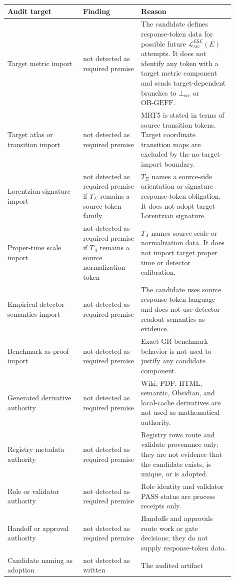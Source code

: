 \documentclass[11pt]{article}
\newcommand{\MetricData}{\mathcal{L}_{\mathrm{src}}^{\mathsf{GSC}}}
\newcommand{\BottomSrc}{\bot_{\mathrm{src}}}
\newcommand{\OBGEFF}{\mathrm{OB\mbox{-}GEFF}}
\begin{document}
\begin{longtable}{p{0.30\linewidth}p{0.23\linewidth}p{0.37\linewidth}}
\toprule
Audit target & Finding & Reason \\
\midrule
Target metric import & not detected as required premise & The candidate
defines response-token data for possible future \(\MetricData(E)\) attempts.
It does not identify any token with a target metric component and sends
target-dependent branches to \(\BottomSrc\) or \(\OBGEFF\). \\
Target atlas or transition import & not detected as required premise &
MRT5 is stated in terms of source transition tokens. Target coordinate
transition maps are excluded by the no-target-import boundary. \\
Lorentzian signature import & not detected as required premise if
\(T_{\Sigma}\) remains a source token family & \(T_{\Sigma}\) names a
source-side orientation or signature response-token obligation. It does not
adopt target Lorentzian signature. \\
Proper-time scale import & not detected as required premise if
\(T_{\Lambda}\) remains a source normalization token & \(T_{\Lambda}\) names
source scale or normalization data. It does not import target proper time or
detector calibration. \\
Empirical detector semantics import & not detected as required premise &
The candidate uses source response-token language and does not use detector
readout semantics as evidence. \\
Benchmark-as-proof import & not detected as required premise & Exact-GR
benchmark behavior is not used to justify any candidate component. \\
Generated derivative authority & not detected as required premise & Wiki,
PDF, HTML, semantic, Obsidian, and local-cache derivatives are not used as
mathematical authority. \\
Registry metadata authority & not detected as required premise & Registry
rows route and validate provenance only; they are not evidence that the
candidate exists, is unique, or is adopted. \\
Role or validator authority & not detected as required premise & Role
identity and validator PASS status are process receipts only. \\
Handoff or approval authority & not detected as required premise & Handoffs
and approvals route work or gate decisions; they do not supply response-token
data. \\
Candidate naming as adoption & not detected as written & The audited artifact

\end{longtable}
\end{document}
